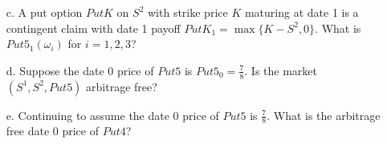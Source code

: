\documentclass[12pt]{article}
\renewcommand{\o}{\omega}
\newcommand{\Ex}{\mathbf{E}}
\begin{document}
\begin{enumerate}
\begin{itemize}
  \item[c.] A put option $PutK$ on $S^2$ with strike price $K$ maturing at date 1 is a contingent claim with date 1 payoff $PutK_1 = \max\{K - S^2, 0\}$. What is $Put5_1(\o_i)$ for $i = 1, 2, 3$?

\begin{comment}  
  \textit{Solution}: $Put5_1 = \begin{bmatrix} 0 & 1 & 3 \end{bmatrix}$.
\end{comment}
  
  \item[d.] Suppose the date 0 price of $Put5$ is $Put5_0 = \frac{7}{8}$. Is the market $(S^1, S^2, Put5)$ arbitrage free?

\begin{comment}  
  \textit{Solution}: To show $(S^1, S^2, Put5)$ is arbitrage free amounts to finding a martingale measure $Q$ of the normalized market $(1, S^2/S^1)$ with $S^1$ as numeraire such that, in addition, $\frac{7}{8} = \frac{1}{2} \Ex^Q Put5_1$.
  
  The above equation plus the characterization of martingale measures for the normalized market $(1, S^2/S^1)$ from part (a) implies $\frac{7}{4} = 1 \cdot (1 - 3q_1) + 3 \cdot (2 q_1)$, which yields $q_1 = \frac{1}{4}$ and a probability $(\frac{1}{4}, \frac{1}{4}, \frac{1}{2})$. Thus, $(S^1, S^2, Put5)$ is arbitrage free because $(\frac{1}{4}, \frac{1}{4}, \frac{1}{2})$ is the unique martingale measure of the corresponding normalized market $(1, S^2/S^1, Put5/S^1)$ with $S^1$ as numeraire.
\end{comment}
  
  
  \item[e.] Continuing to assume the date 0 price of $Put5$ is $\frac{7}{8}$. What is the arbitrage free date 0 price of $Put4$?
 

\end{itemize}
\end{enumerate}
\end{document}

